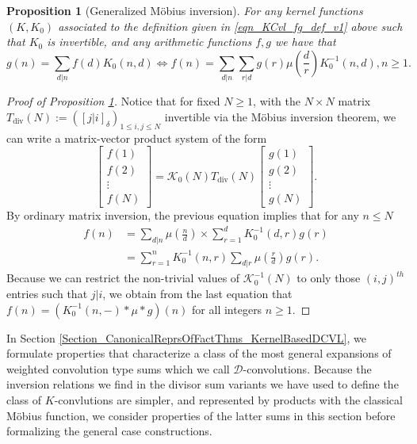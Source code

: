 \documentclass[12pt,reqno,a4letter]{article}
\numberwithin{figure}{section}
\numberwithin{table}{section}
\numberwithin{equation}{section}
\newcommand{\Iverson}[1]{\ensuremath{\left[#1\right]_{\delta}}}
\theoremstyle{plain}
\newtheorem{prop}[theorem]{Proposition}
\numberwithin{theorem}{section}
\theoremstyle{definition}
\begin{document}
\begin{prop}[Generalized M\"obius inversion] 
\label{prop_GenInversionForKCvl_v1} 
For any kernel functions $(K, K_0)$ associated to the definition given in 
\eqref{eqn_KCvl_fg_def_v1} above such that $K_0$ is invertible, 
and any arithmetic functions $f,g$ we have that 
\[
g(n) = \sum_{d|n} f(d) K_0(n,d) \iff f(n) = 
     \sum_{d|n} \sum_{r|d} g(r) \mu\left(\frac{d}{r}\right) K_0^{-1}(n, d), 
     n \geq 1. 
\]
\end{prop} 
\begin{proof}[Proof of Proposition \ref{prop_GenInversionForKCvl_v1}]
Notice that for fixed $N \geq 1$, with the $N \times N$ matrix 
$T_{\operatorname{div}}(N) := (\Iverson{j|i})_{1 \leq i,j \leq N}$ 
invertible via the M\"obius inversion theorem, we 
can write a matrix-vector product system of the form 
\[
\begin{bmatrix} f(1) \\ f(2) \\ \vdots \\ f(N)\end{bmatrix} = \mathcal{K}_0(N) T_{\operatorname{div}}(N) 
     \begin{bmatrix} g(1) \\ g(2) \\ \vdots \\ g(N)\end{bmatrix}. 
\]
By ordinary matrix inversion, the previous equation implies that for any $n \leq N$
\begin{align*}
     f(n) & = \sum_{d|n} \mu\left(\frac{n}{d}\right) \times \sum_{r=1}^d K_0^{-1}(d, r) g(r) \\ 
     & = \sum_{r=1}^{n} K_0^{-1}(n, r) \sum_{d|r} \mu\left(\frac{r}{d}\right) g(r). 
\end{align*}
Because we can restrict the non-trivial values of $\mathcal{K}_0^{-1}(N)$ to only those $(i,j)^{th}$ entries 
such that $j|i$, we obtain from the last equation that 
$f(n) = (K_0^{-1}(n, -) \ast \mu \ast g)(n)$ for all integers $n \geq 1$. 
\end{proof}

In Section \ref{Section_CanonicalReprsOfFactThms_KernelBasedDCVL}, 
we formulate properties that characterize a class of the most general expansions 
of weighted convolution type sums which we call $\mathcal{D}$-convolutions. 
Because the inversion relations we find in the divisor sum variants we have used to define the class of 
$K$-convlutions are simpler, and represented by products with the classical M\"obius function, 
we consider properties of the latter sums in this section before formalizing the general case 
constructions. 
\end{document}
